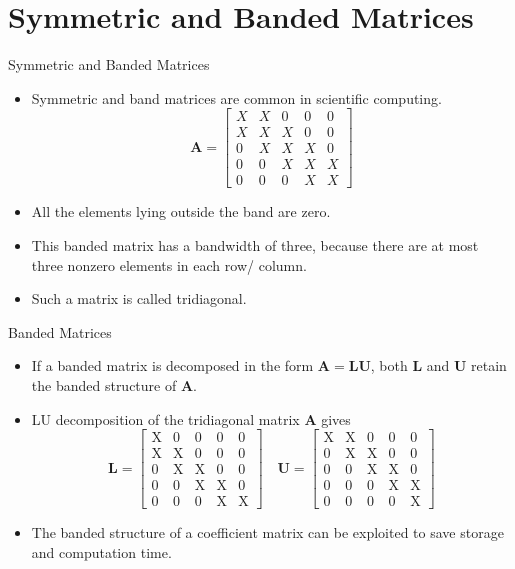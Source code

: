 \documentclass{beamer}
\begin{document}
\section{Symmetric and Banded Matrices}
\begin{frame}{Symmetric and Banded Matrices}
    \begin{itemize}
        \item Symmetric and band matrices are common in scientific computing.
        \[
            \mathbf{A}=\left[\begin{array}{lllll}
                X & X & 0 & 0 & 0 \\
                X & X & X & 0 & 0 \\
                0 & X & X & X & 0 \\
                0 & 0 & X & X & X \\
                0 & 0 & 0 & X & X
                \end{array}\right]
        \]
        \item  All the elements lying outside the band are zero. 
        \item This banded matrix has a bandwidth of three, because there are at most three 
        nonzero elements in each row/ column. 
        \item Such a matrix is called tridiagonal.
    \end{itemize}
\end{frame}
\begin{frame}{Banded Matrices}
    \begin{itemize}
    \item If a banded matrix is decomposed in the form
    $\mathbf{A} = \mathbf{L}\mathbf{U}$, both $\mathbf{L}$ and $\mathbf{U}$ retain the banded structure of $\mathbf{A}$. 
   \item LU decomposition of the tridiagonal matrix $\mathbf{A}$ gives
   \[
    \mathbf{L}=\left[\begin{array}{lllll}
        \mathrm{X} & 0 & 0 & 0 & 0 \\
        \mathrm{X} & \mathrm{X} & 0 & 0 & 0 \\
        0 & \mathrm{X} & \mathrm{X} & 0 & 0 \\
        0 & 0 & \mathrm{X} & \mathrm{X} & 0 \\
        0 & 0 & 0 & \mathrm{X} & \mathrm{X}
        \end{array}\right] \quad \mathbf{U}=\left[\begin{array}{ccccc}
        \mathrm{X} & \mathrm{X} & 0 & 0 & 0 \\
        0 & \mathrm{X} & \mathrm{X} & 0 & 0 \\
        0 & 0 & \mathrm{X} & \mathrm{X} & 0 \\
        0 & 0 & 0 & \mathrm{X} & \mathrm{X} \\
        0 & 0 & 0 & 0 & \mathrm{X}
        \end{array}\right]
   \]
   \item The banded structure of a coefficient matrix can be exploited to save storage and computation time.
    \end{itemize}
\end{frame}
\end{document}
